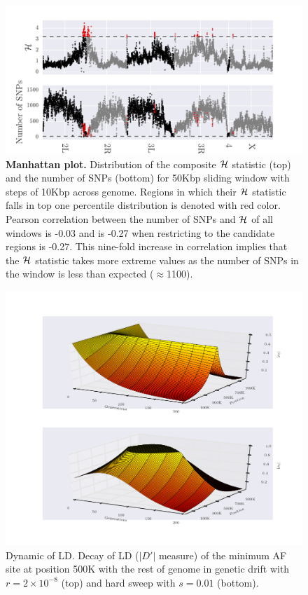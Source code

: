 \begin{figure}[H]
	\centering
	\includegraphics[width=\textwidth]{figures/manhattan.pdf}
	\caption{{\bf Manhattan plot.} Distribution of the composite ${\cal H}$ 
	statistic (top) 
		and the number of SNPs (bottom) for 50Kbp sliding window with steps of 
		10Kbp across genome. Regions in which their ${\cal H}$ statistic falls in 
		top one 
		percentile 
		distribution is denoted with red color. Pearson correlation between the 
		number of SNPs and 
		${\cal H}$ of all windows is -0.03 and is -0.27 when restricting to the 
		candidate regions is -0.27. This 
		nine-fold increase in correlation implies that the ${\cal H}$ statistic 
		takes 
		more extreme values as the number of SNPs in the window is less than 
		expected ($\approx$1100). } 
	\label{fig:manhattan}
\end{figure}

\begin{figure}[H]
	\centering
	\includegraphics[width=\textwidth]{figures/LDDecay3d}
	\caption{ {Dynamic of LD.}
		Decay of LD ($|D'|$ measure) of the minimum AF site at 
		position 500K with the rest of genome in genetic drift with 
		$r=2\times10^{-8}$ (top) and hard sweep with $s=0.01$ (bottom).}	
		\label{fig:ld3d}
\end{figure}

